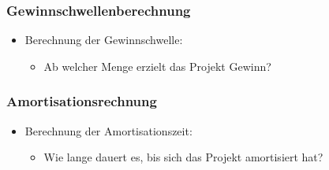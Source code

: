\subsubsection{Gewinnschwellenberechnung}\label{gewinnschwellenberechnung}

\begin{itemize}
\item
  Berechnung der Gewinnschwelle:

  \begin{itemize}
  
  \item
    Ab welcher Menge erzielt das Projekt Gewinn?
  \end{itemize}
\end{itemize}

\subsubsection{Amortisationsrechnung}\label{amortisationsrechnung}

\begin{itemize}
\item
  Berechnung der Amortisationszeit:

  \begin{itemize}
  
  \item
    Wie lange dauert es, bis sich das Projekt amortisiert hat?
  \end{itemize}
\end{itemize}